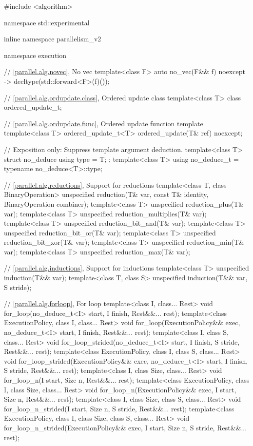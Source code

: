 \begin{codeblock}
#include <algorithm>

namespace std::experimental {
inline namespace parallelism_v2 {
namespace execution {
  // \ref{parallel.alg.novec}, No vec
  template<class F>
    auto no_vec(F&& f) noexcept -> decltype(std::forward<F>(f)());

  // \ref{parallel.alg.ordupdate.class}, Ordered update class
  template<class T>
    class ordered_update_t;

  // \ref{parallel.alg.ordupdate.func}, Ordered update function template
  template<class T>
    ordered_update_t<T> ordered_update(T& ref) noexcept;
}

// Exposition only: Suppress template argument deduction.
template<class T> struct no_deduce { using type = T; };
template<class T> using no_deduce_t = typename no_deduce<T>::type;

// \ref{parallel.alg.reductions}, Support for reductions
template<class T, class BinaryOperation>
  unspecified reduction(T& var, const T& identity, BinaryOperation combiner);
template<class T>
  unspecified reduction_plus(T& var);
template<class T>
  unspecified reduction_multiplies(T& var);
template<class T>
  unspecified reduction_bit_and(T& var);
template<class T>
  unspecified reduction_bit_or(T& var);
template<class T>
  unspecified reduction_bit_xor(T& var);
template<class T>
  unspecified reduction_min(T& var);
template<class T>
  unspecified reduction_max(T& var);

// \ref{parallel.alg.inductions}, Support for inductions
template<class T>
  unspecified induction(T&& var);
template<class T, class S>
  unspecified induction(T&& var, S stride);

// \ref{parallel.alg.forloop}, For loop
template<class I, class... Rest>
  void for_loop(no_deduce_t<I> start, I finish, Rest&&... rest);
template<class ExecutionPolicy,
         class I, class... Rest>
  void for_loop(ExecutionPolicy&& exec,
                no_deduce_t<I> start, I finish, Rest&&... rest);
template<class I, class S, class... Rest>
  void for_loop_strided(no_deduce_t<I> start, I finish,
                        S stride, Rest&&... rest);
template<class ExecutionPolicy,
         class I, class S, class... Rest>
  void for_loop_strided(ExecutionPolicy&& exec,
                        no_deduce_t<I> start, I finish,
                        S stride, Rest&&... rest);
template<class I, class Size, class... Rest>
  void for_loop_n(I start, Size n, Rest&&... rest);
template<class ExecutionPolicy,
         class I, class Size, class... Rest>
  void for_loop_n(ExecutionPolicy&& exec,
                  I start, Size n, Rest&&... rest);
template<class I, class Size, class S, class... Rest>
  void for_loop_n_strided(I start, Size n, S stride, Rest&&... rest);
template<class ExecutionPolicy,
         class I, class Size, class S, class... Rest>
  void for_loop_n_strided(ExecutionPolicy&& exec,
                          I start, Size n, S stride, Rest&&... rest);
}
}
\end{codeblock}


